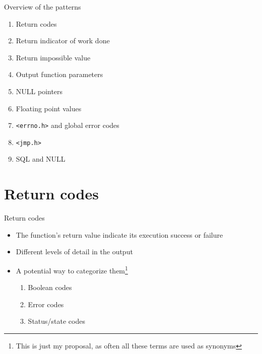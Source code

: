 \documentclass[aspectratio=169,14pt]{beamer}
\begin{document}
\begin{frame}{Overview of the patterns}
    \begin{enumerate}
        \item Return codes
        \item Return indicator of work done
        \item Return impossible value
        \item Output function parameters
        \item NULL pointers
        \item Floating point values
        \item \texttt{<errno.h>} and global error codes
        \item \texttt{<jmp.h>}
        \item SQL and NULL
    \end{enumerate}
\end{frame}


\section{Return codes}

\begin{frame}{Return codes}
\begin{itemize}
    \item The function's return value indicate its execution success or failure
    \item Different levels of detail in the output
    \item A potential way to categorize them\footnote{This is just my proposal, as often all these terms are used as synonyms}
    \begin{enumerate}
        \item Boolean codes
        \item Error codes
        \item Status/state codes
    \end{enumerate}
\end{itemize}
\end{frame}
\end{document}

